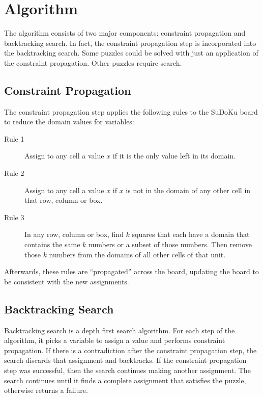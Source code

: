 \section{Algorithm}\label{sec:alg}

The algorithm consists of two major components: constraint propagation and backtracking search. In fact, the constraint propagation step is incorporated into the backtracking search. Some puzzles could be solved with just an application of the constraint propagation. Other puzzles require search.

\subsection{Constraint Propagation}

The constraint propagation step applies the following rules to the SuDoKu board to reduce the domain values for variables:

\begin{description}
	\item[Rule 1] Assign to any cell a value $x$ if it is the only value left in its domain.
	\item[Rule 2] Assign to any cell a value $x$ if $x$ is not in the domain of any other cell in that row, column or box.
	\item[Rule 3] In any row, column or box, find $k$ squares that each have a domain that contains the same $k$ numbers or a subset of those numbers. Then remove those $k$ numbers from the domains of all other cells of that unit.
\end{description}

Afterwards, these rules are ``propagated'' across the board, updating the board to be consistent with the new assignments.

\subsection{Backtracking Search}

Backtracking search is a depth first search algorithm. For each step of the algorithm, it picks a variable to assign a value and performs constraint propagation. If there is a contradiction after the constraint propagation step, the search discards that assignment and backtracks. If the constraint propagation step was successful, then the search continues making another assignment. The search continues until it finds a complete assignment that satisfies the puzzle, otherwise returns a failure.

